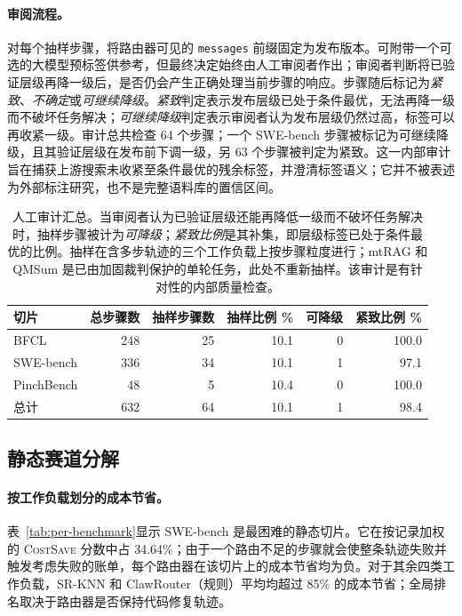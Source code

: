 \paragraph{审阅流程。}
对每个抽样步骤，将路由器可见的 \texttt{messages} 前缀固定为发布版本。可附带一个可选的大模型预标签供参考，但最终决定始终由人工审阅者作出；审阅者判断将已验证层级再降一级后，是否仍会产生正确处理当前步骤的响应。步骤随后标记为\emph{紧致}、\emph{不确定}或\emph{可继续降级}。\emph{紧致}判定表示发布层级已处于条件最优，无法再降一级而不破坏任务解决；\emph{可继续降级}判定表示审阅者认为发布层级仍然过高，标签可以再收紧一级。审计总共检查 64 个步骤；一个 SWE-bench 步骤被标记为可继续降级，且其验证层级在发布前下调一级，另 63 个步骤被判定为紧致。这一内部审计旨在捕获上游搜索未收紧至条件最优的残余标签，并澄清标签语义；它并不被表述为外部标注研究，也不是完整语料库的置信区间。

\begin{table}[ht]
\centering
\small
\caption{人工审计汇总。当审阅者认为已验证层级还能再降低一级而不破坏任务解决时，抽样步骤被计为\emph{可降级}；\emph{紧致比例}是其补集，即层级标签已处于条件最优的比例。抽样在含多步轨迹的三个工作负载上按步骤粒度进行；mtRAG 和 QMSum 是已由加固裁判保护的单轮任务，此处不重新抽样。该审计是有针对性的内部质量检查。}
\label{tab:manual-audit}
\begin{tabular}{lrrrrr}
\toprule
切片 & 总步骤数 & 抽样步骤数 & 抽样比例 \% & 可降级 & 紧致比例 \% \\
\midrule
BFCL & 248 & 25 & 10.1 & 0 & 100.0 \\
SWE-bench & 336 & 34 & 10.1 & 1 & 97.1 \\
PinchBench & 48 & 5 & 10.4 & 0 & 100.0 \\
\midrule
总计 & 632 & 64 & 10.1 & 1 & 98.4 \\
\bottomrule
\end{tabular}
\end{table}

\subsection{静态赛道分解}
\label{app:static-breakdown}

\paragraph{按工作负载划分的成本节省。}

表~\ref{tab:per-benchmark}显示 SWE-bench 是最困难的静态切片。它在按记录加权的 \textsc{CostSave} 分数中占 34.64\%；由于一个路由不足的步骤就会使整条轨迹失败并触发考虑失败的账单，每个路由器在该切片上的成本节省均为负。对于其余四类工作负载，SR-KNN 和 ClawRouter（规则）平均均超过 85\% 的成本节省；全局排名取决于路由器是否保持代码修复轨迹。

